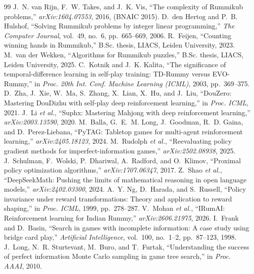 \documentclass[10pt,journal,compsoc]{IEEEtran}
\begin{document}
\footnotesize
\begin{thebibliography}{99}
\setlength{\itemsep}{0pt}\setlength{\parskip}{0pt}
 J.~N. van Rijn, F.~W. Takes, and J.~K. Vis, ``The complexity of Rummikub problems,'' \emph{arXiv:1604.07553}, 2016, (BNAIC 2015).
 D.~den Hertog and P.~B. Hulshof, ``Solving Rummikub problems by integer linear programming,'' \emph{The Computer Journal}, vol.~49, no.~6, pp.~665--669, 2006.
 R.~Feijen, ``Counting winning hands in Rummikub,'' B.Sc. thesis, LIACS, Leiden University, 2023.
 M.~van der Wekken, ``Algorithms for Rummikub puzzles,'' B.Sc. thesis, LIACS, Leiden University, 2025.
 C.~Kotnik and J.~K. Kalita, ``The significance of temporal-difference learning in self-play training: TD-Rummy versus EVO-Rummy,'' in \emph{Proc. 20th Int. Conf. Machine Learning (ICML)}, 2003, pp.~369--375.
 D.~Zha, J.~Xie, W.~Ma, S.~Zhang, X.~Lian, X.~Hu, and J.~Liu, ``DouZero: Mastering DouDizhu with self-play deep reinforcement learning,'' in \emph{Proc. ICML}, 2021.
 J.~Li \emph{et al.}, ``Suphx: Mastering Mahjong with deep reinforcement learning,'' \emph{arXiv:2003.13590}, 2020.
 M.~Balla, G.~E.~M. Long, J.~Goodman, R.~D. Gaina, and D.~Perez-Liebana, ``PyTAG: Tabletop games for multi-agent reinforcement learning,'' \emph{arXiv:2405.18123}, 2024.
 M.~Rudolph \emph{et al.}, ``Reevaluating policy gradient methods for imperfect-information games,'' \emph{arXiv:2502.08938}, 2025.
 J.~Schulman, F.~Wolski, P.~Dhariwal, A.~Radford, and O.~Klimov, ``Proximal policy optimization algorithms,'' \emph{arXiv:1707.06347}, 2017.
 Z.~Shao \emph{et al.}, ``DeepSeekMath: Pushing the limits of mathematical reasoning in open language models,'' \emph{arXiv:2402.03300}, 2024.
 A.~Y. Ng, D.~Harada, and S.~Russell, ``Policy invariance under reward transformations: Theory and application to reward shaping,'' in \emph{Proc. ICML}, 1999, pp.~278--287.
 V.~Mohan \emph{et al.}, ``IRumAI: Reinforcement learning for Indian Rummy,'' \emph{arXiv:2606.21975}, 2026.
 I.~Frank and D.~Basin, ``Search in games with incomplete information: A case study using bridge card play,'' \emph{Artificial Intelligence}, vol.~100, no.~1--2, pp.~87--123, 1998.
 J.~Long, N.~R. Sturtevant, M.~Buro, and T.~Furtak, ``Understanding the success of perfect information Monte Carlo sampling in game tree search,'' in \emph{Proc. AAAI}, 2010.

\end{thebibliography}
\end{document}
